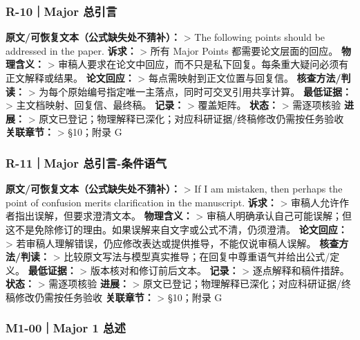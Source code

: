 \documentclass[
  chinese,
  UTF8]{ctexart}
\begin{document}
\subsubsection{R-10｜Major 总引言}\label{r-10major-ux603bux5f15ux8a00}

\textbf{原文/可恢复文本（公式缺失处不猜补）：} \textgreater{} The
following points should be addressed in the paper. \textbf{诉求：}
\textgreater{} 所有 Major Points 都需要论文层面的回应。
\textbf{物理含义：} \textgreater{}
审稿人要求在论文中回应，而不只是私下回复。每条重大疑问必须有正文解释或结果。
\textbf{论文回应：} \textgreater{} 每点需映射到正文位置与回复信。
\textbf{核查方法/判读：} \textgreater{}
为每个原始编号指定唯一主落点，同时可交叉引用共享计算。
\textbf{最低证据：} \textgreater{} 主文档映射、回复信、最终稿。
\textbf{记录：} \textgreater{} 覆盖矩阵。 \textbf{状态：} \textgreater{}
需逐项核验 \textbf{进展：} \textgreater{}
原文已登记；物理解释已深化；对应科研证据/终稿修改仍需按任务验收
\textbf{关联章节：} \textgreater{} §10；附录 G

\subsubsection{R-11｜Major
总引言-条件语气}\label{r-11major-ux603bux5f15ux8a00-ux6761ux4ef6ux8bedux6c14}

\textbf{原文/可恢复文本（公式缺失处不猜补）：} \textgreater{} If I am
mistaken, then perhaps the point of confusion merits clarification in
the manuscript. \textbf{诉求：} \textgreater{}
审稿人允许作者指出误解，但要求澄清文本。 \textbf{物理含义：}
\textgreater{}
审稿人明确承认自己可能误解；但这不是免除修订的理由。如果误解来自文字或公式不清，仍须澄清。
\textbf{论文回应：} \textgreater{}
若审稿人理解错误，仍应修改表达或提供推导，不能仅说审稿人误解。
\textbf{核查方法/判读：} \textgreater{}
比较原文写法与模型真实推导；在回复中尊重语气并给出公式/定义。
\textbf{最低证据：} \textgreater{} 版本核对和修订前后文本。
\textbf{记录：} \textgreater{} 逐点解释和稿件措辞。 \textbf{状态：}
\textgreater{} 需逐项核验 \textbf{进展：} \textgreater{}
原文已登记；物理解释已深化；对应科研证据/终稿修改仍需按任务验收
\textbf{关联章节：} \textgreater{} §10；附录 G

\subsubsection{M1-00｜Major 1 总述}\label{m1-00major-1-ux603bux8ff0}
\end{document}
